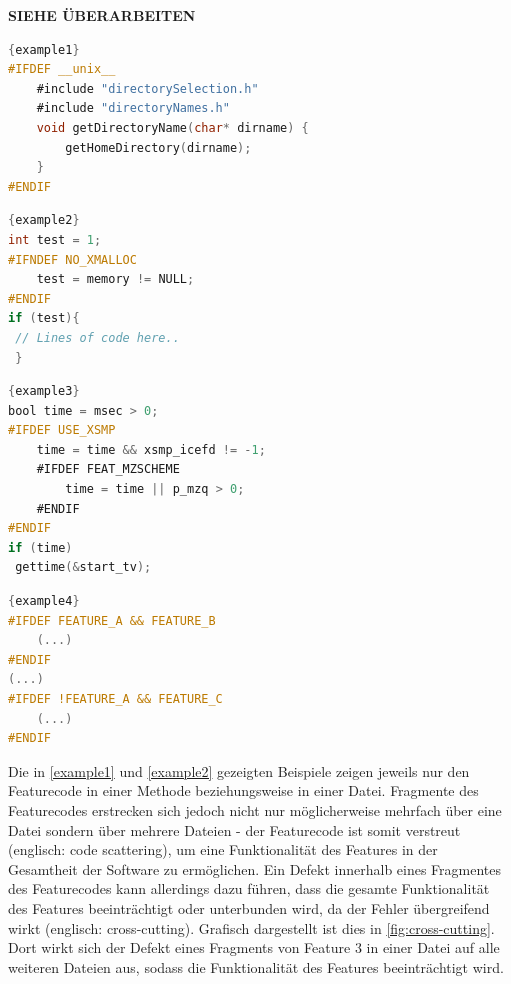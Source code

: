 \textbf{SIEHE \cite{Preschern2019} ÜBERARBEITEN}

\noindent\begin{minipage}{.45\textwidth}
\begin{lstlisting}[caption=Beispieleinsatz von \texttt{\#IFDEF} nach \cite{Preschern2019},frame=tlrb,language=C, label=example1]{example1}
#IFDEF __unix__
	#include "directorySelection.h"
	#include "directoryNames.h"
	void getDirectoryName(char* dirname) {
		getHomeDirectory(dirname);
	}
#ENDIF
\end{lstlisting}
\end{minipage}\hfill
\begin{minipage}{.45\textwidth}
\begin{lstlisting}[caption=Beispieleinsatz von \texttt{\#IFNDEF} nach \cite{Medeiros2018},frame=tlrb,language=C, label=example2]{example2}
int test = 1;
#IFNDEF NO_XMALLOC
	test = memory != NULL;
#ENDIF
if (test){
 // Lines of code here..
 } 
\end{lstlisting}
\end{minipage}

\noindent\begin{minipage}{.45\textwidth}
\begin{lstlisting}[caption=Beispiel eines verschachtelten Einsatzes von \texttt{\#IFDEF} nach \cite{Medeiros2018} ,frame=tlrb,language=C, label=example3, firstnumber=1]{example3}
bool time = msec > 0;
#IFDEF USE_XSMP
	time = time && xsmp_icefd != -1;
	#IFDEF FEAT_MZSCHEME
 		time = time || p_mzq > 0;
	#ENDIF
#ENDIF
if (time)
 gettime(&start_tv);
\end{lstlisting}
\end{minipage}\hfill
\begin{minipage}{.45\textwidth}
\begin{lstlisting}[caption=Beispiele von erweiterten Bedingungen nach \cite{Queiroz2015},frame=tlrb,language=C, label=example4, firstnumber=1]{example4}
#IFDEF FEATURE_A && FEATURE_B
	(...)
#ENDIF
(...)
#IFDEF !FEATURE_A && FEATURE_C
	(...)
#ENDIF
\end{lstlisting}
\end{minipage}

Die in \autoref{example1} und \autoref{example2} gezeigten Beispiele zeigen jeweils nur den Featurecode in einer Methode beziehungsweise in einer Datei. Fragmente des Featurecodes erstrecken sich jedoch nicht nur möglicherweise mehrfach über eine Datei sondern über mehrere Dateien - der Featurecode ist somit verstreut (englisch: code scattering), um eine Funktionalität des Features in der Gesamtheit der Software zu ermöglichen. Ein Defekt innerhalb eines Fragmentes des Featurecodes kann allerdings dazu führen, dass die gesamte Funktionalität des Features beeinträchtigt oder unterbunden wird, da der Fehler übergreifend wirkt (englisch: cross-cutting). Grafisch dargestellt ist dies in \autoref{fig:cross-cutting}. Dort wirkt sich der Defekt eines Fragments von Feature 3 in einer Datei auf alle weiteren Dateien aus, sodass die Funktionalität des Features beeinträchtigt wird.

